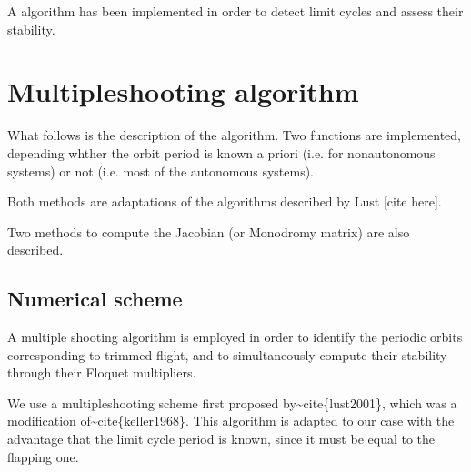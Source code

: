 \documentclass[letterpaper,10pt,english,openany,oneside]{sphinxmanual}
\begin{document}
A  algorithm has been implemented in order to detect limit cycles and assess their stability.


\chapter{Multiple\sphinxhyphen{}shooting algorithm}
\label{\detokenize{multiple_shooting/index:multiple-shooting-algorithm}}\label{\detokenize{multiple_shooting/index::doc}}
What follows is the description of the  algorithm. Two functions are implemented, depending whther the orbit period is known a priori (i.e. for non\sphinxhyphen{}autonomous systems) or not (i.e. most of the autonomous systems).

Both methods are adaptations of the algorithms described by Lust {[}cite here{]}.

Two methods to compute the Jacobian (or Monodromy matrix) are also described.


\section{Numerical scheme}
\label{\detokenize{multiple_shooting/numerical_scheme:numerical-scheme}}\label{\detokenize{multiple_shooting/numerical_scheme::doc}}
A multiple shooting algorithm is employed in order to identify the periodic orbits corresponding to trimmed flight, and to simultaneously compute their stability through their Floquet multipliers.

We use a multiple\sphinxhyphen{}shooting scheme first proposed by\textasciitilde{}cite\{lust2001\}, which was a modification of\textasciitilde{}cite\{keller1968\}. This algorithm is adapted to our case with the advantage that the limit cycle period is known, since it must be equal to the flapping one.

\begin{figure}[htbp]
\centering

\noindent{}
\end{figure}
\end{document}
